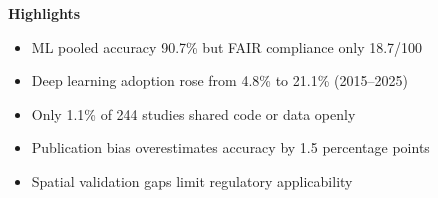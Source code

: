 \documentclass[12pt]{article}
\begin{document}
\noindent
\textbf{\Large Highlights}

\vspace{18pt}

\begin{itemize}
  \item ML pooled accuracy 90.7\% but FAIR compliance only 18.7/100
  \item Deep learning adoption rose from 4.8\% to 21.1\% (2015--2025)
  \item Only 1.1\% of 244 studies shared code or data openly
  \item Publication bias overestimates accuracy by 1.5 percentage points
  \item Spatial validation gaps limit regulatory applicability
\end{itemize}
\end{document}
